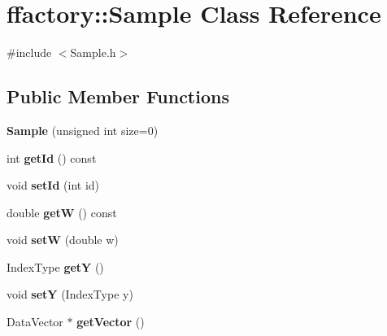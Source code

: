 \hypertarget{classffactory_1_1_sample}{\section{ffactory\-:\-:Sample Class Reference}
\label{classffactory_1_1_sample}
}


{\ttfamily \#include $<$Sample.\-h$>$}

\subsection*{Public Member Functions}
\begin{DoxyCompactItemize}
\item 
\hypertarget{classffactory_1_1_sample_a6d3f2879613fbe80f101e8f8af87f40a}{{\bfseries Sample} (unsigned int size=0)}\label{classffactory_1_1_sample_a6d3f2879613fbe80f101e8f8af87f40a}

\item 
\hypertarget{classffactory_1_1_sample_a24c0e29e03a2c1ce189920c848b4a9e5}{int {\bfseries get\-Id} () const }\label{classffactory_1_1_sample_a24c0e29e03a2c1ce189920c848b4a9e5}

\item 
\hypertarget{classffactory_1_1_sample_ae7f343bafa89806d75c3beea76215bec}{void {\bfseries set\-Id} (int id)}\label{classffactory_1_1_sample_ae7f343bafa89806d75c3beea76215bec}

\item 
\hypertarget{classffactory_1_1_sample_a9069a51ee24a184d5eedc58fd5b4da13}{double {\bfseries get\-W} () const }\label{classffactory_1_1_sample_a9069a51ee24a184d5eedc58fd5b4da13}

\item 
\hypertarget{classffactory_1_1_sample_ab357f855dfdb00fc8dd80ba66e796ff6}{void {\bfseries set\-W} (double w)}\label{classffactory_1_1_sample_ab357f855dfdb00fc8dd80ba66e796ff6}

\item 
\hypertarget{classffactory_1_1_sample_ae0c49aa36c4efae8a28a944eb357eeb5}{Index\-Type {\bfseries get\-Y} ()}\label{classffactory_1_1_sample_ae0c49aa36c4efae8a28a944eb357eeb5}

\item 
\hypertarget{classffactory_1_1_sample_a47eb71ba1a8292193603fec16d1b6c93}{void {\bfseries set\-Y} (Index\-Type y)}\label{classffactory_1_1_sample_a47eb71ba1a8292193603fec16d1b6c93}

\item 
\hypertarget{classffactory_1_1_sample_a02262c332e309bcb0ca6104d48a5008f}{Data\-Vector $\ast$ {\bfseries get\-Vector} ()}\label{classffactory_1_1_sample_a02262c332e309bcb0ca6104d48a5008f}


\end{DoxyCompactItemize}
